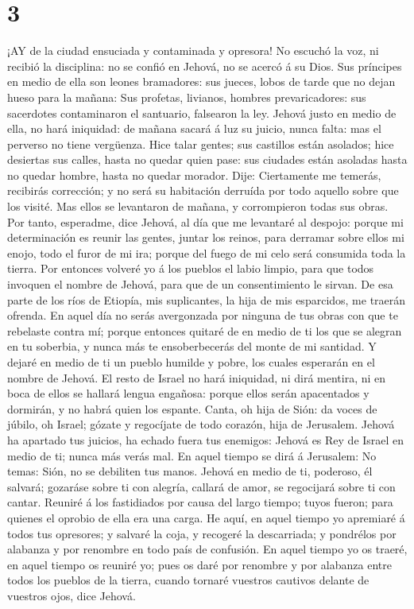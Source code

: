 \hypertarget{section-2}{%
\section{3}\label{section-2}}

 ¡AY de la ciudad ensuciada y contaminada y opresora!
 No escuchó la voz, ni recibió la disciplina: no se confió
en Jehová, no se acercó á su Dios.  Sus príncipes en medio
de ella son leones bramadores: sus jueces, lobos de tarde que no dejan
hueso para la mañana:  Sus profetas, livianos, hombres
prevaricadores: sus sacerdotes contaminaron el santuario, falsearon la
ley.  Jehová justo en medio de ella, no hará iniquidad: de
mañana sacará á luz su juicio, nunca falta: mas el perverso no tiene
vergüenza.  Hice talar gentes; sus castillos están asolados;
hice desiertas sus calles, hasta no quedar quien pase: sus ciudades
están asoladas hasta no quedar hombre, hasta no quedar morador.
 Dije: Ciertamente me temerás, recibirás corrección; y no
será su habitación derruída por todo aquello sobre que los visité. Mas
ellos se levantaron de mañana, y corrompieron todas sus obras.
 Por tanto, esperadme, dice Jehová, al día que me levantaré
al despojo: porque mi determinación es reunir las gentes, juntar los
reinos, para derramar sobre ellos mi enojo, todo el furor de mi ira;
porque del fuego de mi celo será consumida toda la tierra. 
Por entonces volveré yo á los pueblos el labio limpio, para que todos
invoquen el nombre de Jehová, para que de un consentimiento le sirvan.
 De esa parte de los ríos de Etiopía, mis suplicantes, la
hija de mis esparcidos, me traerán ofrenda.  En aquel día
no serás avergonzada por ninguna de tus obras con que te rebelaste
contra mí; porque entonces quitaré de en medio de ti los que se alegran
en tu soberbia, y nunca más te ensoberbecerás del monte de mi santidad.
 Y dejaré en medio de ti un pueblo humilde y pobre, los
cuales esperarán en el nombre de Jehová.  El resto de
Israel no hará iniquidad, ni dirá mentira, ni en boca de ellos se
hallará lengua engañosa: porque ellos serán apacentados y dormirán, y no
habrá quien los espante.  Canta, oh hija de Sión: da voces
de júbilo, oh Israel; gózate y regocíjate de todo corazón, hija de
Jerusalem.  Jehová ha apartado tus juicios, ha echado fuera
tus enemigos: Jehová es Rey de Israel en medio de ti; nunca más verás
mal.  En aquel tiempo se dirá á Jerusalem: No temas: Sión,
no se debiliten tus manos.  Jehová en medio de ti,
poderoso, él salvará; gozaráse sobre ti con alegría, callará de amor, se
regocijará sobre ti con cantar.  Reuniré á los fastidiados
por causa del largo tiempo; tuyos fueron; para quienes el oprobio de
ella era una carga.  He aquí, en aquel tiempo yo apremiaré
á todos tus opresores; y salvaré la coja, y recogeré la descarriada; y
pondrélos por alabanza y por renombre en todo país de confusión.
 En aquel tiempo yo os traeré, en aquel tiempo os reuniré
yo; pues os daré por renombre y por alabanza entre todos los pueblos de
la tierra, cuando tornaré vuestros cautivos delante de vuestros ojos,
dice Jehová.
